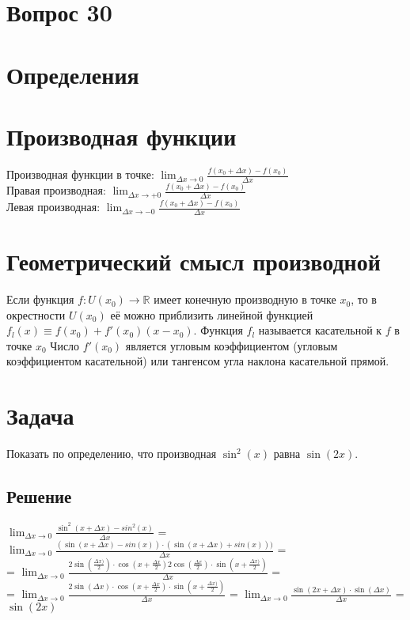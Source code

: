\documentclass[a4paper,12pt]{article}
\newcommand\ddfrac[2]{\frac{\displaystyle #1}{\displaystyle #2}}
\begin{document}
\section*{Вопрос 30}
\section*{Определения}
\section*{Производная функции}
	Производная функции в точке:
	$\lim _{{\Delta x\to 0}}{\ddfrac  {f(x_{0}+\Delta x)-f(x_{0})}{\Delta x}}$\\
	Правая производная:
	$\lim _{{\Delta x\to +0}}{\ddfrac  {f(x_{0}+\Delta x)-f(x_{0})}{\Delta x}}$\\
	Левая производная:
	$\lim _{{\Delta x\to -0}}{\ddfrac  {f(x_{0}+\Delta x)-f(x_{0})}{\Delta x}}$
\section*{Геометрический смысл производной}
	Если функция ${f\colon U(x_{0})\to \mathbb {R} }$
	  имеет конечную производную в точке $x_0$, то в окрестности
		 $U(x_{0})$ её можно приблизить линейной функцией
${f_{l}(x)\equiv f(x_{0})+f'(x_{0})(x-x_{0})}$.
Функция ${f_{l}}$ называется касательной к $f$
в точке $x_{0}$ Число ${f'(x_{0})}$
 является угловым коэффициентом (угловым коэффициентом касательной) или тангенсом угла наклона касательной прямой.
 \section*{Задача}
 Показать по определению, что производная $\sin^{2}(x)$ равна $\sin(2x)$.
 \subsection*{Решение}
 $\lim _{{\Delta x\to 0}}{\ddfrac{\sin^2(x+\Delta x)-sin^2(x)}{\Delta x}}$ =
 $\lim _{{\Delta x\to 0}}{\ddfrac{(\sin(x+\Delta x)-sin(x))\cdot
 (\sin(x+\Delta x)+sin(x)))}{\Delta x}}$ =\\=
 $\lim _{{\Delta x\to 0}}{\ddfrac{2\sin(\frac{\Delta x)}{2})\cdot\cos(x+\frac{\Delta x}{2})
 2\cos(\frac{\Delta x}{2}) \cdot\sin(x+\frac{\Delta x)}{2})
 }{\Delta x}}$ =\\= $\lim _{{\Delta x\to 0}}{\ddfrac{2\sin(\Delta x)\cdot\cos(x+\frac{\Delta x}{2})
 \cdot\sin(x+\frac{\Delta x)}{2})
 }{\Delta x}}$ = $\lim _{{\Delta x\to 0}}{\ddfrac{\sin(2x+\Delta x)\cdot\sin(\Delta x)}{\Delta x}}$
 = $\sin(2x)$
\end{document}
